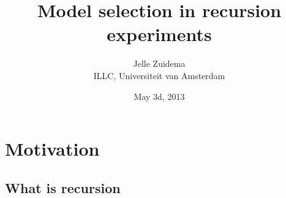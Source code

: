 \documentclass[xcolor=table]{beamer}
\title{Model selection in recursion experiments}
\author{Jelle Zuidema\\ ILLC, Universiteit van Amsterdam}
\date{May 3d, 2013}
\newcommand{\blue}[1]{\textcolor{blue}{#1}}
\newcommand{\red}[1]{\textcolor{red}{#1}}
\newcommand{\green}[1]{\textcolor{green}{#1}}
\begin{document}
\begin{frame}
\titlepage
\end{frame}

\section{Motivation}
\label{sec:motivation}

\subsection{What is recursion}




\end{document}
